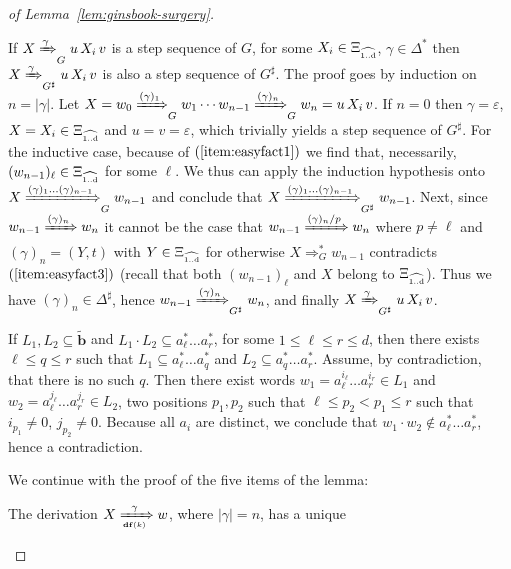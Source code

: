 \documentclass[final]{llncs}
\def\len#1{{\vert{#1}\vert}}
\def\prod{\Delta}
\def\patt{{\widetilde{\mathbf{b}}}}
\def\df#1{\scriptscriptstyle\mathbf{df}(#1)}
\def\Varse{\ensuremath{\Xi_{\widehat{\text{\tiny 1..d}}}}}
\begin{document}
\begin{proof}[of Lemma~\ref{lem:ginsbook-surgery}]
\begin{compactenum}
\item\label{item:easyfact4} If \( X \xRightarrow{\gamma}_G u\, X_i\,
  v\) is a step sequence of \(G\), for some \(X_i\in\Varse\),
  \(\gamma\in\prod^*\) then \( X \xRightarrow{\gamma}_{G^\sharp} u\,
  X_i\, v\) is also a step sequence of \(G^\sharp\). The proof goes by
  induction on \(n=\len{\gamma}\). Let \( X = w_0
	\xRightarrow{(\gamma)_{1}}_G w_1 \cdots w_{n-1} \xRightarrow{(\gamma)_{n}}_G
  w_n = u\, X_i\, v\).  If \(n=0\) then \(\gamma=\varepsilon\),
  \(X=X_i\in\Varse\) and \(u=v=\varepsilon\), which trivially yields a
  step sequence of \(G^\sharp\). For the inductive case, because of \(
	(\ref{item:easyfact1}) \) we find that, necessarily, \( (w_{n-1})_{\ell} \in \Varse \) for some \(\ell\).  We thus can apply the
  induction hypothesis onto \( X \xRightarrow{(\gamma)_{1}\ldots
    (\gamma)_{n-1}}_G w_{n-1}\) and conclude that \( X
  \xRightarrow{(\gamma)_{1}\ldots (\gamma)_{n-1}}_{G^\sharp}
	w_{n-1}\). Next, since \(w_{n-1}\xRightarrow{(\gamma)_n} w_{n}\) it cannot be the case that
	\(w_{n-1}\xRightarrow{ (\gamma)_n / p} w_{n}\) where \(p\neq \ell\) and \( (\gamma)_n=(Y,t) \) with \(Y\in \Varse\) for otherwise
	\(X \Rightarrow^*_G w_{n-1}\) contradicts \((\ref{item:easyfact3})\) (recall that both \( (w_{n-1})_{\ell} \) and \( X \) belong to \(\Varse\)).
	Thus we have \((\gamma)_n\in\prod^\sharp\),
  hence \( w_{n-1} \xRightarrow{(\gamma)_n}_{G^\sharp} w_n\), and
  finally \( X \xRightarrow{\gamma}_{G^\sharp} u\, X_i\, v\).
\item\label{item:easyfact5} If \(L_1,L_2 \subseteq \patt\) and
  \(L_1\cdot L_2 \subseteq a_{\ell}^* \ldots a_r^*\), for some \(1
  \leq \ell \leq r \leq d\), then there exists \(\ell \leq q \leq r\) such that \(L_1 \subseteq a_{\ell}^* \ldots a_q^*\) and \(L_2
  \subseteq a_{q}^* \ldots a_{r}^*\). Assume, by contradiction, that
  there is no such \(q\).  Then there exist words \(w_1 =
  a_{\ell}^{i_{\ell}}\ldots a_{r}^{i_r}\in L_1\) and \( w_2 =
  a_{\ell}^{j_{\ell}}\ldots a_{r}^{j_r} \in L_2\), two positions
  \(p_1,p_2\) such that \(\ell\leq p_2 < p_1 \leq r\) such that \(
  i_{p_1}\neq 0 \), \( j_{p_2}\neq 0 \). Because all \(a_i\) are
  distinct, we conclude that \(w_1 \cdot w_2 \notin a_{\ell}^* \ldots
  a_r^*\), hence a contradiction.
\end{compactenum}
We continue with the proof of the five items of the lemma:
\begin{compactenum}[1.]
\item The derivation $X \xRightarrow[\df{k}]{\gamma} w$, where \(\len{\gamma} = n\), has a unique

\end{compactenum}
\end{proof}
\end{document}
